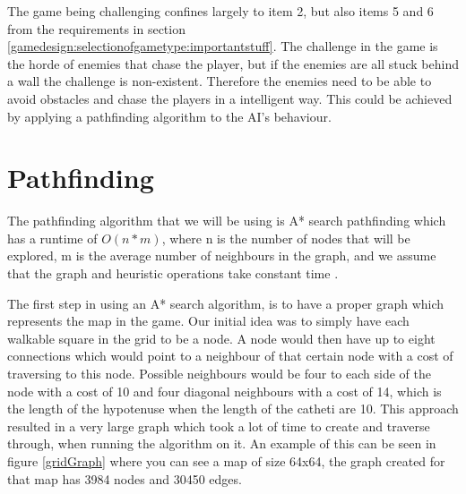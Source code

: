 The game being challenging confines largely to item 2, but also items 5 and 6 from the requirements in section \ref{gamedesign:selectionofgametype:importantstuff}.
The challenge in the game is the horde of enemies that chase the player, but if the enemies are all stuck behind a wall the challenge is non-existent.
Therefore the enemies need to be able to avoid obstacles and chase the players in a intelligent way.
This could be achieved by applying a pathfinding algorithm to the AI's behaviour.

\section{Pathfinding}

The pathfinding algorithm that we will be using is A* search pathfinding which has a runtime of $O(n*m)$, where n is the number of nodes that will be explored, m is the average number of neighbours in the graph, and we assume that the graph and heuristic operations take constant time \cite{AIG:Millington}.

The first step in using an A* search algorithm, is to have a proper graph which represents the map in the game.
Our initial idea was to simply have each walkable square in the grid to be a node.
A node would then have up to eight connections which would point to a neighbour of that certain node with a cost of traversing to this node.
Possible neighbours would be four to each side of the node with a cost of 10 and four diagonal neighbours with a cost of 14, which is the length of the hypotenuse when the length of the catheti are 10.
This approach resulted in a very large graph which took a lot of time to create and traverse through, when running the algorithm on it.
An example of this can be seen in figure \ref{gridGraph} where you can see a map of size 64x64, the graph created for that map has 3984 nodes and 30450 edges.

